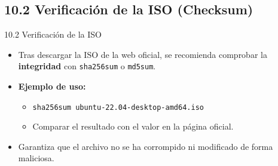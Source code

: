 \documentclass{beamer}
\begin{document}
\subsection{10.2 Verificación de la ISO (Checksum)}
\begin{frame}{10.2 Verificación de la ISO}
	\begin{itemize}
		\item Tras descargar la ISO de la web oficial, se recomienda comprobar la \textbf{integridad} con \texttt{sha256sum} o \texttt{md5sum}.
		\item \textbf{Ejemplo de uso:}  
			\begin{itemize}
				\item \texttt{sha256sum ubuntu-22.04-desktop-amd64.iso}
				\item Comparar el resultado con el valor en la página oficial.
			\end{itemize}
		\item Garantiza que el archivo no se ha corrompido ni modificado de forma maliciosa.
	\end{itemize}
\end{frame}
\end{document}
